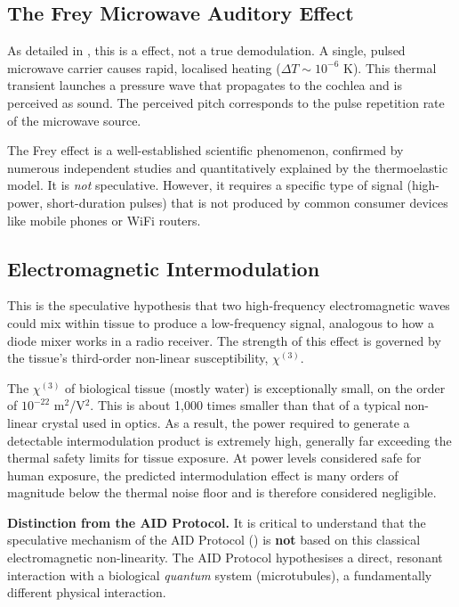 \subsection{The Frey Microwave Auditory Effect}

As detailed in , this is a  effect, not a true demodulation. A single, pulsed microwave carrier causes rapid, localised heating ($\Delta T \sim 10^{-6}$ K). This thermal transient launches a pressure wave that propagates to the cochlea and is perceived as sound. The perceived pitch corresponds to the pulse repetition rate of the microwave source.

The Frey effect is a well-established scientific phenomenon, confirmed by numerous independent studies and quantitatively explained by the thermoelastic model. It is \emph{not} speculative. However, it requires a specific type of signal (high-power, short-duration pulses) that is not produced by common consumer devices like mobile phones or WiFi routers.


\subsection{Electromagnetic Intermodulation}

This is the speculative hypothesis that two high-frequency electromagnetic waves could mix within tissue to produce a low-frequency signal, analogous to how a diode mixer works in a radio receiver. The strength of this effect is governed by the tissue's third-order non-linear susceptibility, $\chi^{(3)}$.

The $\chi^{(3)}$ of biological tissue (mostly water) is exceptionally small, on the order of $10^{-22}$ m$^2$/V$^2$. This is about 1,000 times smaller than that of a typical non-linear crystal used in optics. As a result, the power required to generate a detectable intermodulation product is extremely high, generally far exceeding the thermal safety limits for tissue exposure. At power levels considered safe for human exposure, the predicted intermodulation effect is many orders of magnitude below the thermal noise floor and is therefore considered negligible.

\begin{warningbox}
    \textbf{Distinction from the AID Protocol.} It is critical to understand that the speculative mechanism of the AID Protocol () is \textbf{not} based on this classical electromagnetic non-linearity. The AID Protocol hypothesises a direct, resonant interaction with a biological \emph{quantum} system (microtubules), a fundamentally different physical interaction.
\end{warningbox}

